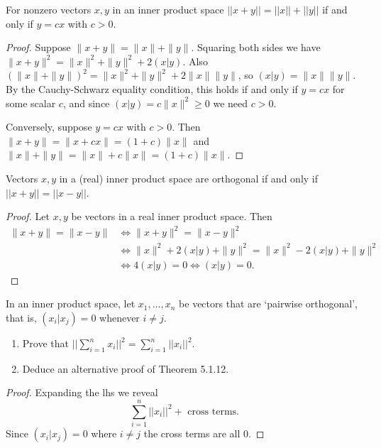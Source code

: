 \begin{tcolorbox}[title=Problem 3, breakable]
    For nonzero vectors $x, y$ in an inner product space 
    $||x + y|| = ||x|| + ||y||$ if and only if $y = cx$ with $c > 0$.
\end{tcolorbox}

\begin{proof}
    Suppose $\|x + y\| = \|x\| + \|y\|$.
    Squaring both sides we have $\|x + y\|^2 = \|x\|^2 + \|y\|^2 + 2(x|y)$.
    Also $(\|x\| + \|y\|)^2 = \|x\|^2 + \|y\|^2 + 2\|x\|\|y\|$, so $(x|y) = \|x\|\|y\|$.
    By the Cauchy-Schwarz equality condition, this holds if and only if $y = cx$ for some scalar $c$,
    and since $(x|y) = c\|x\|^2 \geq 0$ we need $c > 0$.

    Conversely, suppose $y = cx$ with $c > 0$.
    Then $\|x + y\| = \|x + cx\| = (1+c)\|x\|$ and $\|x\| + \|y\| = \|x\| + c\|x\| = (1+c)\|x\|$.
\end{proof}


\begin{tcolorbox}[title=Problem 4, breakable]
    Vectors $x, y$ in a (real) inner product space are orthogonal if and only if 
    $||x + y|| = ||x - y||$.
\end{tcolorbox}

\begin{proof}
    Let $x, y$ be vectors in a real inner product space. Then 
    \begin{align*}
        \|x + y\| = \|x - y\| &\iff \|x + y\|^2 = \|x - y\|^2 \\
        &\iff \|x\|^2 + 2(x|y) + \|y\|^2 = \|x\|^2 - 2(x|y) + \|y\|^2 \\
        &\iff 4(x|y) = 0 \iff (x|y) = 0.
    \end{align*}
\end{proof}

\begin{tcolorbox}[title=Problem 5, breakable]
    In an inner product space, let $x_1, \ldots, x_n$ be vectors that are 
    `pairwise orthogonal', that is, $(x_i|x_j) = 0$ whenever $i \ne j$.
    \begin{enumerate}
        \item Prove that $|| \sum_{i = 1}^{n} x_i ||^2 = \sum_{i = 1}^{n} ||x_i||^2$.
        \item Deduce an alternative proof of Theorem 5.1.12.
    \end{enumerate}
\end{tcolorbox}

\begin{proof}
    Expanding the lhs we reveal 
    \[\sum_{i = 1}^{n} ||x_i||^2 + \text{ cross terms.}\]
    Since $(x_i|x_j) = 0$ where $i \ne j$ the cross terms are all $0$.
\end{proof}

